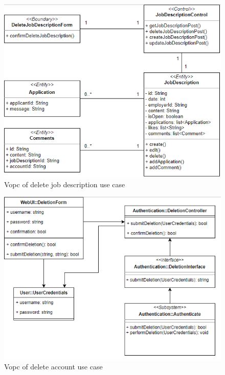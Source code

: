\documentclass[a4paper]{article}
\begin{document}
\begin{figure}[H]
    \centering
    \includegraphics[width=1.0\textwidth]{vopc_del_jd.png}
    \caption{Vopc of delete job description use case}
    \label{fig:fig29}
\end{figure}

\begin{figure}[H]
    \centering
    \includegraphics[width=1.0\textwidth]{vopc_delacc.png}
    \caption{Vopc of delete account use case}
    \label{fig:fig30}
\end{figure}
\end{document}
